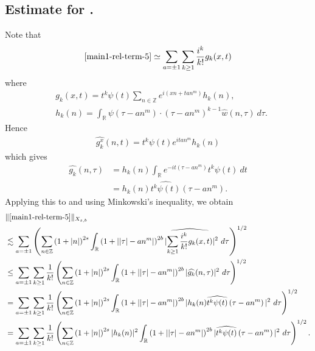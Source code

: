 \documentclass[12pt,reqno]{amsart}
\numberwithin{equation}{section}  %
\renewcommand{\cref}{\Cref}
\newcommand{\rr}{\mathbb{R}}
\newcommand{\zz}{\mathbb{Z}}
\newcommand{\wh}{\widehat}
\begin{document}
\subsection{Estimate for \cref{main1-rel-term-5}.}
Note that
%
%
\begin{equation}
	\label{1n}
	\begin{split}
    \cref{main1-rel-term-5} \simeq \sum_{a = \pm 1}\sum_{k \ge 1}
		\frac{i^k}{k!}g_k(x,t)
	\end{split}
\end{equation}
%
%
where 
%
%
\begin{equation*}
	\begin{split}
		& g_k(x,t) = t^k \psi(t) \sum_{n \in \zz} e^{i\left( xn + ta n^{m}
		\right)} h_k(n),
		\\
		& h_k(n) = \int_\rr \psi \left( \tau - an^{m} \right) \cdot \left(
		\tau - an^{m} \right)^{k -1} \wh{w}(n, \tau) \ d \tau.
	\end{split}
\end{equation*}
%
%
Hence
%
%
\begin{equation*}
	\begin{split}
		\wh{g_k^x}(n, t) = t^{k} \psi(t) e^{i t an^{m}} h_k(n)
	\end{split}
\end{equation*}
%
%
which gives
%
%
\begin{equation*}
	\begin{split}
		\wh{g_k}(n, \tau)
		& = h_k(n) \int_\rr e^{-it\left( \tau - an^{m} \right)}
		t^{k}\psi(t) \ dt
		\\
		& = h_k(n) \wh{t^{k}\psi(t)} \left( \tau - an^{m} \right).
	\end{split}
\end{equation*}
%
%
Applying this to \cref{1n} and using Minkowski's inequality, we obtain
%
%
\begin{equation}
	\label{2n}
	\begin{split}
		& \|\cref{main1-rel-term-5}\|_{X_{s,b}} 
    \\
    & \lesssim \sum_{a = \pm 1} \left( \sum_{n \in \zz} \left (1 + |n| \right )^{2s}
    \int_\rr \left( 1 + | |\tau| - an^{m} | \right)^{2b}
    | \wh{\sum_{k \ge 1} \frac{i^k}{k!}g_k(x,t)} |^2 \ d \tau
		\right)^{1/2}
		\\
		& \le \sum_{a = \pm 1}\sum_{k \ge 1} \frac{1}{k!}\left( \sum_{n \in \zz} \left (1 + |n| \right )^{2s}
    \int_\rr \left( 1 + | |\tau| - an^{m} | \right)^{2b} | \wh{g_k}(n, \tau) |^2 \
		d \tau \right)^{1/2}
		\\
		& = \sum_{a = \pm 1}\sum_{k \ge 1} \frac{1}{k!} \left( \sum_{n \in \zz} \left (1 + |n| \right )^{2s}
    \int_\rr \left( 1 + | |\tau| - an^{m} | \right)^{2b} | h_k(n) \wh{t^k
		\psi(t)} \left( \tau - an^{m} \right) |^2 \ d \tau \right)^{1/2}
		\\
		& = \sum_{a = \pm 1}\sum_{k \ge 1} \frac{1}{k!} \left( \sum_{n \in \zz} \left (1 + |n| \right )^{2s} |
    h_k(n) |^2 \int_\rr \left( 1 + | |\tau| - an^{m} | \right)^{2b} | \wh{t^k
		\psi(t)} \left( \tau - an^{m} \right) |^2 \ d \tau \right)^{1/2}.
	\end{split}
\end{equation}
\end{document}
